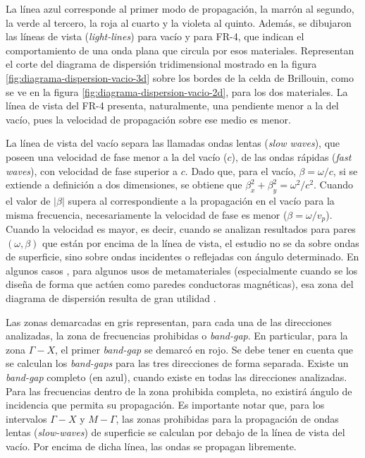 La línea azul corresponde al primer modo de propagación, la marrón al segundo, la verde al tercero, la roja al cuarto y la violeta al quinto. Además, se dibujaron las líneas de vista (\textit{light-lines}) para vacío y para FR-4, que indican el comportamiento de una onda plana que circula por esos materiales. Representan el corte del diagrama de dispersión tridimensional mostrado en la figura \ref{fig:diagrama-dispersion-vacio-3d} sobre los bordes de la celda de Brillouin, como se ve en la figura \ref{fig:diagrama-dispersion-vacio-2d}, para los dos materiales. La línea de vista del FR-4 presenta, naturalmente, una pendiente menor a la del vacío, pues la velocidad de propagación sobre ese medio es menor.

La línea de vista del vacío separa las llamadas ondas lentas (\textit{slow waves}), que poseen una velocidad de fase menor a la del vacío ($c$), de las ondas rápidas (\textit{fast waves}), con velocidad de fase superior a $c$. Dado que, para el vacío, $\beta=\omega/c$, si se extiende a definición a dos dimensiones, se obtiene que $\beta_x^2 + \beta_y^2 = \omega^2/c^2$. Cuando el valor de $|\beta|$ supera al correspondiente a la propagación en el vacío para la misma frecuencia, necesariamente la velocidad de fase es menor ($\beta = \omega / v_p$). Cuando la velocidad es mayor, es decir, cuando se analizan resultados para pares $(\omega,\beta)$ que están por encima de la línea de vista, el estudio no se da sobre ondas de superficie, sino sobre ondas incidentes o reflejadas con ángulo determinado. En algunos casos \cite{Maci:Pole-zero-matching}, para algunos usos de metamateriales (especialmente cuando se los diseña de forma que actúen como paredes conductoras magnéticas), esa zona del diagrama de dispersión resulta de gran utilidad \cite{Yang:EBGAntennas}.

Las zonas demarcadas en gris representan, para cada una de las direcciones analizadas, la zona de frecuencias prohibidas o \textit{band-gap}. En particular, para la zona $\Gamma-X$, el primer \textit{band-gap} se demarcó en rojo. Se debe tener en cuenta que se calculan los \textit{band-gaps} para  las tres direcciones de forma separada. Existe un \textit{band-gap} completo (en azul), cuando existe en todas las direcciones analizadas. Para las frecuencias dentro de la zona prohibida completa, no existirá ángulo de incidencia que permita su propagación. Es importante notar que, para los intervalos $\Gamma-X$ y $M-\Gamma$, las zonas prohibidas para la propagación de ondas lentas (\textit{slow-waves}) de superficie se calculan por debajo de la línea de vista del vacío. Por encima de dicha línea, las ondas se propagan libremente.

